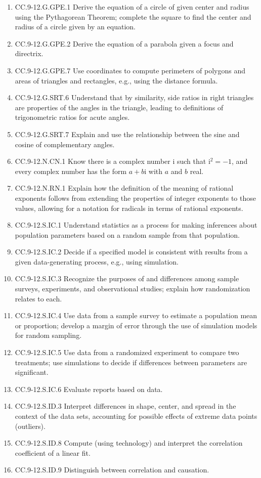 \begin{enumerate}
	\item CC.9-12.G.GPE.1  Derive the equation of a circle of given center and radius using the Pythagorean Theorem; complete the square to find the center and radius of a circle given by an equation.
	\item CC.9-12.G.GPE.2 Derive the equation of a parabola given a focus and directrix.
	\item CC.9-12.G.GPE.7  Use coordinates to compute perimeters of polygons and areas of triangles and rectangles, e.g., using the distance formula.
	\item CC.9-12.G.SRT.6 Understand that by similarity, side ratios in right triangles are properties of the angles in the triangle, leading to definitions of trigonometric ratios for acute angles.
	\item CC.9-12.G.SRT.7  Explain and use the relationship between the sine and cosine of complementary angles.
	\item CC.9-12.N.CN.1 Know there is a complex number i such that $\textrm{i}^2 =-1$, and every complex number has the form $a + b\textrm{i}$ with $a$ and $b$ real.  
	\item CC.9-12.N.RN.1 Explain how the definition of the meaning of rational exponents follows from extending the properties of integer exponents to those values, allowing for a notation for radicals in terms of rational exponents. 
	\item CC.9-12.S.IC.1  Understand statistics as a process for making inferences about population parameters based on a random sample from that population.
	\item CC.9-12.S.IC.2  Decide if a specified model is consistent with results from a given data-generating process, e.g., using simulation. 
	\item CC.9-12.S.IC.3  Recognize the purposes of and differences among sample surveys, experiments, and observational studies; explain how randomization relates to each.
	\item CC.9-12.S.IC.4  Use data from a sample survey to estimate a population mean or proportion; develop a margin of error through the use of simulation models for random sampling.
	\item CC.9-12.S.IC.5  Use data from a randomized experiment to compare two treatments; use simulations to decide if differences between parameters are significant.
	\item CC.9-12.S.IC.6  Evaluate reports based on data.
	\item CC.9-12.S.ID.3 Interpret differences in shape, center, and spread in the context of the data sets, accounting for possible effects of extreme data points (outliers).
	\item CC.9-12.S.ID.8  Compute (using technology) and interpret the correlation coefficient of a linear fit.
	\item CC.9-12.S.ID.9  Distinguish between correlation and causation.
\end{enumerate}
